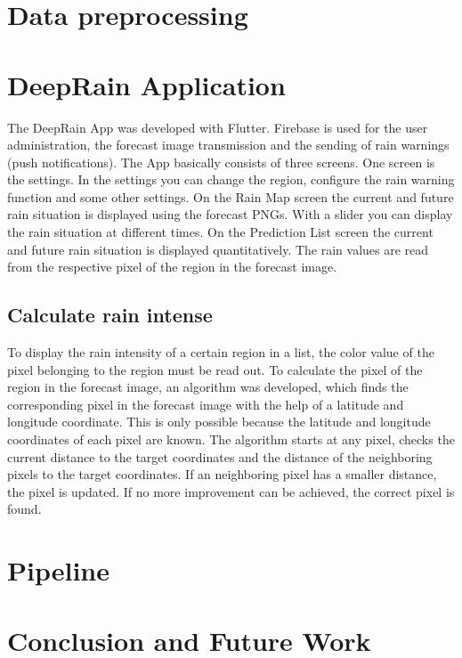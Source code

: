 \documentclass[oneside]{htwg-report}
\begin{document}
\section*{Data preprocessing}

\section*{DeepRain Application}
    \begin{sloppypar}
        The DeepRain App was developed with Flutter. 
        Firebase is used for the user administration, the forecast image transmission and the sending of rain warnings (push notifications). 
        The App basically consists of three screens. One screen is the settings. 
        In the settings you can change the region, configure the rain warning function and some other settings.
        On the Rain Map screen the current and future rain situation is displayed using the forecast PNGs. With a slider you can display the rain situation at different times.
        On the Prediction List screen the current and future rain situation is displayed quantitatively. The rain values are read from the respective pixel of the region in the forecast image.   
    \end{sloppypar}
\subsection*{Calculate rain intense}
    \begin{sloppypar}
        To display the rain intensity of a certain region in a list, the color value of the pixel belonging to the region must be read out. 
        To calculate the pixel of the region in the forecast image, an algorithm was developed, which finds the corresponding pixel in the forecast image with the help of a latitude and longitude coordinate. 
        This is only possible because the latitude and longitude coordinates of each pixel are known. 
        The algorithm starts at any pixel, checks the current distance to the target coordinates and the distance of the neighboring pixels to the target coordinates. 
        If an neighboring pixel has a smaller distance, the pixel is updated. If no more improvement can be achieved, the correct pixel is found. 
    \end{sloppypar}


\section*{Pipeline}


\section*{Conclusion and Future Work}
\end{document}

